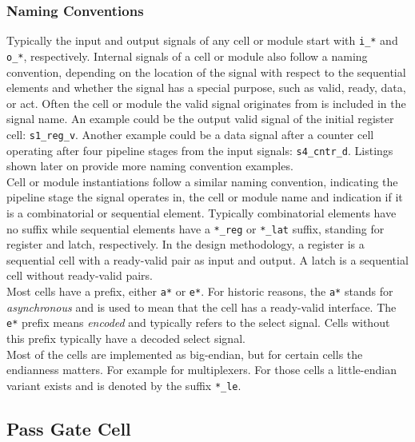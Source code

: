 \subsubsection{Naming Conventions}
Typically the input and output signals of any cell or module start with \texttt{i\_*} and \texttt{o\_*}, respectively. Internal signals of a cell or module also follow a naming convention, depending on the location of the signal with respect to the sequential elements and whether the signal has a special purpose, such as valid, ready, data, or act. Often the cell or module the valid signal originates from is included in the signal name. An example could be the output valid signal of the initial register cell: \texttt{s1\_reg\_v}. Another example could be a data signal after a counter cell operating after four pipeline stages from the input signals: \texttt{s4\_cntr\_d}. Listings shown later on provide more naming convention examples.\\
Cell or module instantiations follow a similar naming convention, indicating the pipeline stage the signal operates in, the cell or module name and indication if it is a combinatorial or sequential element. Typically combinatorial elements have no suffix while sequential elements have a \texttt{*\_reg} or \texttt{*\_lat} suffix, standing for register and latch, respectively. In the design methodology, a register is a sequential cell with a ready-valid pair as input and output. A latch is a sequential cell without ready-valid pairs.\\
Most cells have a prefix, either \texttt{a*} or \texttt{e*}. For historic reasons, the \texttt{a*} stands for \textit{asynchronous} and is used to mean that the cell has a ready-valid interface. The \texttt{e*} prefix means \textit{encoded} and typically refers to the select signal. Cells without this prefix typically have a decoded select signal.\\
Most of the cells are implemented as big-endian, but for certain cells the endianness matters. For example for multiplexers. For those cells a little-endian variant exists and is denoted by the suffix \texttt{*\_le}.





\subsection{Pass Gate Cell}

